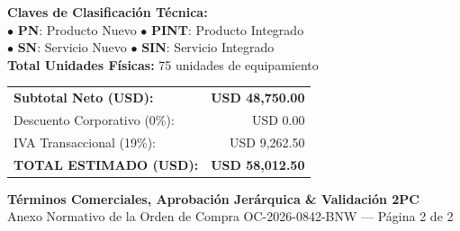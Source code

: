 \documentclass[10pt,letterpaper]{article}
\begin{document}
\noindent
\begin{minipage}[t]{0.48\textwidth}
  \vspace{0.05cm}
  {\footnotesize
  \textbf{Claves de Clasificaci\'on T\'ecnica:}\\
  $\bullet$ \textbf{PN}: Producto Nuevo $\bullet$ \textbf{PINT}: Producto Integrado\\
  $\bullet$ \textbf{SN}: Servicio Nuevo $\bullet$ \textbf{SIN}: Servicio Integrado\\[4pt]
  \textbf{Total Unidades F\'isicas:} 75 unidades de equipamiento}
\end{minipage}\hfill
\begin{minipage}[t]{0.48\textwidth}
  \begin{tcolorbox}[
    enhanced,
    colback=corpLightBg,
    colframe=corpBorder,
    arc=1.5mm,
    boxrule=0.7pt,
    top=2mm, bottom=2mm, left=3mm, right=3mm
  ]
    \renewcommand{\arraystretch}{1.15}
    \begin{tabularx}{\linewidth}{@{}Xr@{}}
      {\footnotesize\textbf{Subtotal Neto (USD):}} & {\footnotesize\bfseries USD 48,750.00} \\
      {\footnotesize Descuento Corporativo (0\%):} & {\footnotesize USD 0.00} \\
      {\footnotesize IVA Transaccional (19\%):} & {\footnotesize USD 9,262.50} \\
      \midrule
      {\normalsize\bfseries\color{corpDarkHeader}TOTAL ESTIMADO (USD):} & {\normalsize\bfseries\color{corpPrimary}USD 58,012.50} \\
    \end{tabularx}
  \end{tcolorbox}
\end{minipage}

\clearpage


\drawchromaticbar[3.5pt]
\vspace{0.2cm}

\begin{center}
    {\large\bfseries\color{corpDarkHeader}T\'erminos Comerciales, Aprobaci\'on Jer\'arquica \& Validaci\'on 2PC}\\[1pt]
    {\footnotesize\color{corpTextMuted}Anexo Normativo de la Orden de Compra OC-2026-0842-BNW --- P\'agina 2 de 2}
\end{center}
\end{document}
